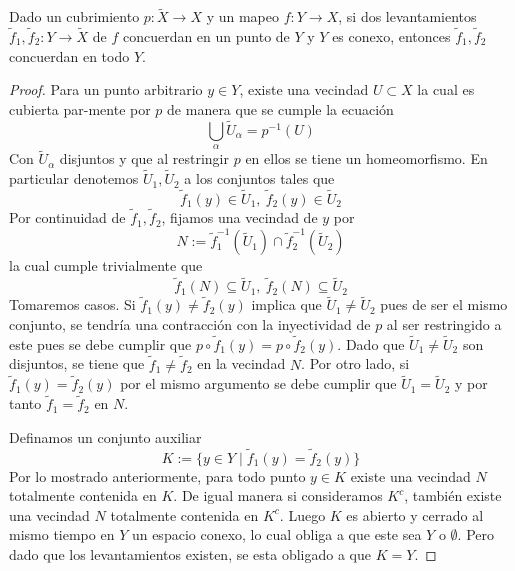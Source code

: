 \begin{teorema}\label{thm:uniq-general}
  Dado un cubrimiento \(p : \tilde X \to X\) y un mapeo \(f : Y \to X\),
  si dos levantamientos \(\tilde f _1 , \tilde f _2 : Y \to \tilde X\)
  de \(f\) concuerdan en un punto de \(Y\) y \(Y\) es conexo, entonces
  \(\tilde f _1 , \tilde f _2\) concuerdan en todo \(Y\).
\end{teorema}
\begin{proof}
  Para un punto arbitrario \(y \in Y\), existe una vecindad \(U \subset
  X\) la cual es cubierta par-mente por \(p\) de manera que se cumple la
  ecuación
  \[ \bigcup_{\alpha} \tilde U_\alpha = p^{-1} \left( U \right)\]
  Con \(\tilde U _\alpha\) disjuntos y que al restringir \(p\) en ellos
  se tiene un homeomorfismo. En particular denotemos \(\tilde U
  _1 , \tilde U _2\) a los conjuntos tales que
  \[ \tilde f _1 ( y ) \in \tilde U _1,\ \tilde f _2 ( y ) \in \tilde U
    _2 \]
  Por continuidad de \(\tilde f_1, \tilde f_2 \), fijamos una vecindad
  de \(y\) por
  \[ N := \tilde f _1 ^{-1} (\tilde U _1) \cap \tilde f _2 ^{-1} (\tilde
    U _2) \]
  la cual cumple trivialmente que
  \[ \tilde f_1 (N) \subseteq \tilde U _1,\ \tilde f_2 (N) \subseteq
    \tilde U _2 \]
  Tomaremos casos. Si \(\tilde f _1 (y) \neq \tilde f _2 (y)\) implica
  que \(\tilde U _1 \neq \tilde U _2\) pues de ser el mismo conjunto, se
  tendría una contracción con la inyectividad de \(p\) al ser
  restringido a este pues se debe cumplir que \( p \circ \tilde f _1 (y)
  = p \circ \tilde f _2 (y)\). Dado que \(\tilde U_1 \neq \tilde U _ 2\)
  son disjuntos, se tiene que \(\tilde f_1 \neq \tilde f_2 \) en la
  vecindad \(N\). Por otro lado, si \(\tilde f _1 (y) = \tilde f _2
  (y)\) por el mismo argumento se debe cumplir que \(\tilde U _1 = \tilde
  U _2\) y por tanto \(\tilde f _1 = \tilde f _2\) en \(N\).

  Definamos un conjunto auxiliar
  \[ K := \{ y \in Y \mid \tilde f_1 (y) = \tilde f_2 (y) \} \]
  Por lo mostrado anteriormente, para todo punto \(y \in K\) existe una
  vecindad \(N\) totalmente contenida en \(K\). De igual manera si
  consideramos \(K^c\), también existe una vecindad \(N\) totalmente
  contenida en \(K^c\). Luego \(K\) es abierto y cerrado al mismo tiempo
  en \(Y\) un espacio conexo, lo cual obliga a que este sea \(Y\) o
  \(\emptyset\). Pero dado que los levantamientos existen, se esta
  obligado a que \(K = Y\).
\end{proof}

